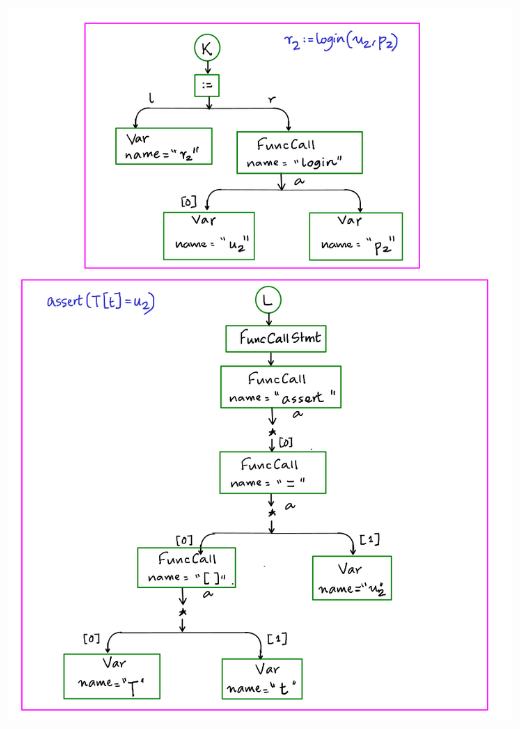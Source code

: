 \documentclass[12pts, a4paper]{article}
\begin{document}
\begin{center}
\includegraphics[width=\textwidth]{../images/ACT-AST-15.png}
\end{center}
\end{document}

